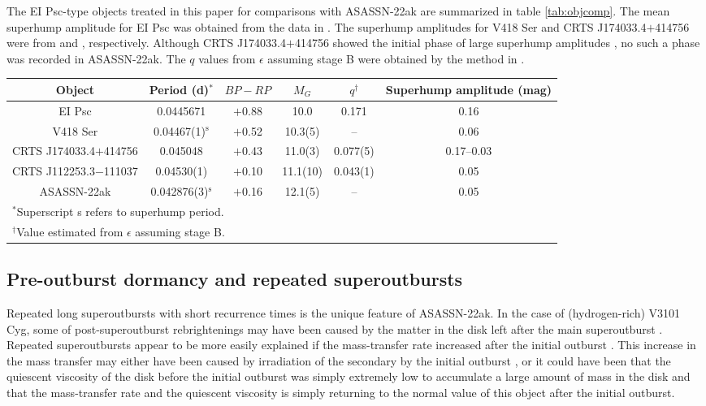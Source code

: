 \documentclass{article}
\def\commenta{$^*$}
\def\commentb{$^\dagger$}
\begin{document}
   The EI Psc-type objects treated in this paper for comparisons
with ASASSN-22ak are summarized in table \ref{tab:objcomp}.
The mean superhump amplitude for EI Psc was obtained from
the data in \citet{uem02j2329letter}.
The superhump amplitudes for V418 Ser and CRTS J174033.4$+$414756
were from \citet{Pdot7} and \citet{ima18j1740}, respectively.
Although CRTS J174033.4$+$414756 showed the initial phase of large
superhump amplitudes \citep{ima18j1740}, no such a phase was
recorded in ASASSN-22ak.  The $q$ values from $\epsilon$ assuming stage B
were obtained by the method in \citet{kat22stageA}.

\begin{table*}
\caption{Comparison of objects treated in this paper.}\label{tab:objcomp}
\begin{center}
\begin{tabular}{cccccc}
\hline
Object & Period (d)\commenta & $BP-RP$ & $M_G$ & $q$\commentb & Superhump amplitude (mag) \\
\hline
EI Psc & 0.0445671 & $+$0.88 & 10.0 & 0.171 & 0.16 \\
V418 Ser & 0.04467(1)$^\textrm{s}$ & $+$0.52 & 10.3(5) & -- & 0.06 \\
CRTS J174033.4$+$414756 & 0.045048 & $+$0.43 & 11.0(3) & 0.077(5) & 0.17--0.03 \\
CRTS J112253.3$-$111037 & 0.04530(1) & $+$0.10 & 11.1(10) & 0.043(1) & 0.05 \\
ASASSN-22ak & 0.042876(3)$^\textrm{s}$ & $+$0.16 & 12.1(5) & -- & 0.05 \\
\hline
  \multicolumn{6}{l}{\commenta Superscript s refers to superhump period.} \\
  \multicolumn{6}{l}{\commentb Value estimated from $\epsilon$ assuming stage B.} \\
\end{tabular}
\end{center}
\end{table*}

\subsection{Pre-outburst dormancy and repeated superoutbursts}

   Repeated long superoutbursts with short recurrence times
is the unique feature of ASASSN-22ak.  In the case of
(hydrogen-rich) V3101 Cyg, some of post-superoutburst
rebrightenings may have been caused by the matter in the disk
left after the main superoutburst \citep{tam20v3101cyg}.
Repeated superoutbursts appear to be more easily explained
if the mass-transfer rate increased after the initial outburst
\citep{ham21DNrebv3101cyg}.  This increase in the mass transfer
may either have been caused by irradiation of the secondary
by the initial outburst \citep{ham21DNrebv3101cyg},
or it could have been that the quiescent viscosity of the disk
before the initial outburst was simply extremely low to accumulate
a large amount of mass in the disk and that the mass-transfer
rate and the quiescent viscosity is simply returning to
the normal value of this object after the initial outburst.
\end{document}
